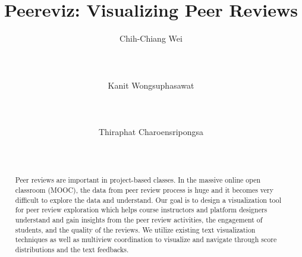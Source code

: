 \documentclass{sigchi}
\begin{document}
\title{Peereviz: Visualizing Peer Reviews}

\author{
  \alignauthor Chih-Chiang Wei\\
    \\
    \\
    \\    
  \alignauthor Kanit Wongsuphasawat\\
    \\
    \\
    \\    
  \alignauthor Thiraphat Charoensripongsa\\
    \\
    \\
}


\maketitle

\begin{abstract}

Peer reviews are important in project-based classes. In the massive online open classroom (MOOC), the data from peer review process is huge and it becomes very difficult to explore the data and understand. Our goal is to design a visualization tool for peer review exploration which helps course instructors and platform designers understand and gain insights from the peer review activities, the engagement of students, and the quality of the reviews. We utilize existing text visualization techniques as well as multiview coordination to visualize and navigate through score distributions and the text feedbacks.

\end{abstract}

\end{document}
